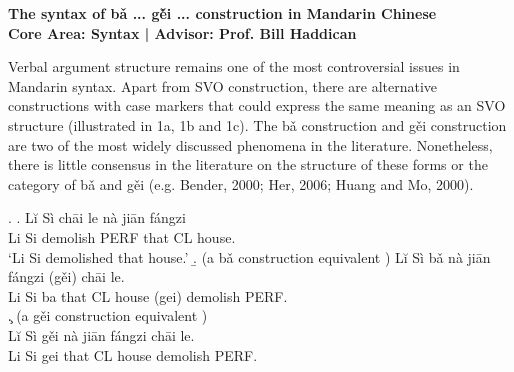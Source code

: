 \documentclass[12pt, oneside]{article}   	%
\begin{document}
 \vspace*{-15mm}

\begin{center}
\Large
\textbf{The syntax of  b\v{a} ... g\v{ě}i ...  construction in Mandarin Chinese\\
Core Area: Syntax | Advisor: Prof. Bill Haddican }\normalsize\\

%

\end{center}






	Verbal argument structure remains one of the most controversial issues in Mandarin syntax. Apart from SVO construction, there are alternative constructions with case markers that could express the same meaning as an SVO structure (illustrated in 1a, 1b and 1c). The bǎ construction and gěi construction are two of the most widely discussed phenomena in the literature. Nonetheless, there is little consensus in the literature on the structure of these forms or the category of bǎ and gěi (e.g. Bender, 2000; Her, 2006; Huang and Mo, 2000).

\ex. \a. Lĭ Sì	 chāi	 	le 	nà 	jiān 	fángzi\\
         Li Si	 demolish     PERF  that	 CL 	house.\\
	‘Li Si demolished that house.’
      \b. (a bǎ construction equivalent )
	Lĭ Sì 	bǎ 	nà 	jiān 	fángzi 	     (gěi) 	chāi 		le. \\
	Li Si	ba	that 	CL	house	     (gei)	demolish	PERF.	\\
      \c.  (a gěi construction equivalent )\\
	Lĭ Sì	gěi 	nà 	jiān 	fángzi      chāi 	le.\\
	Li Si	gei	that 	CL	house	     demolish	PERF.	
\end{document}
